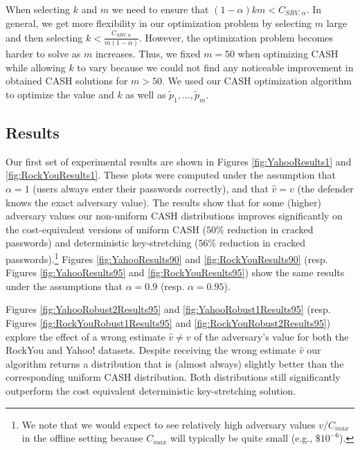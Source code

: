 {When selecting $k$ and $m$ we need to ensure that $(1-\alpha)km < C_{SRV,\alpha}$. In general, we get more flexibility in our optimization problem by selecting $m$ large and then selecting $k < \frac{C_{SRV,\alpha}}{m(1-\alpha)}$. However, the optimization problem becomes harder to solve as $m$ increases. Thus, we fixed $m=50$ when optimizing CASH while allowing $k$ to vary because we could not find any noticeable improvement in obtained CASH solutions for $m > 50$. We used our CASH optimization algorithm to optimize the value and $k$ as well as $\tilde{p}_1,\ldots,\tilde{p}_m$. }


\subsection{Results}
Our first set of experimental results are shown in Figures \ref{fig:YahooResults1} and \ref{fig:RockYouResults1}. These plots were computed under the assumption that $\alpha = 1$ (users always enter their passwords correctly), and that $\hat{v}=v$ (the defender knows the exact adversary value). The results show that for some (higher) adversary values our non-uniform CASH distributions improves significantly on the cost-equivalent versions of uniform CASH ($50\%$ reduction in cracked passwords) and deterministic key-stretching ($56\%$ reduction in cracked passwords).\footnote{We note that we would expect to see relatively high adversary  values $v/C_{max}$ in the offline setting because $C_{max}$ will typically be quite small (e.g., $\$10^{-6}$). }  Figures \ref{fig:YahooResults90} and \ref{fig:RockYouResults90} (resp. Figures \ref{fig:YahooResults95} and \ref{fig:RockYouResults95}) show the same results under the assumptions that $\alpha = 0.9$ (resp. $\alpha=0.95$). 

Figures \ref{fig:YahooRobust2Results95} and \ref{fig:YahooRobust1Results95} (resp. Figures \ref{fig:RockYouRobust1Results95} and \ref{fig:RockYouRobust2Results95}) explore the effect of a wrong estimate $\hat{v} \neq v$ of the adversary's value for both the RockYou and Yahoo! datasets. Despite receiving the wrong estimate $\hat{v}$ our algorithm returns a distribution that is (almost always) slightly better than the corresponding uniform CASH distribution. Both distributions still significantly outperform the cost equivalent deterministic key-stretching solution. 

